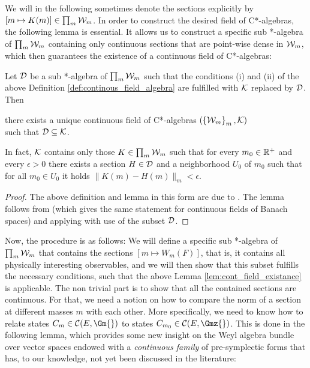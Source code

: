 We will in the following sometimes denote the sections explicitly by $[m \mapsto K(m)] \in \prod_{m} \mathcal{W}_m$.
In order to construct the desired field of C*-algebras, the following lemma is essential. It allows us to construct a specific sub *-algebra of $\prod_{m} \mathcal{W}_m$ containing only continuous sections that are point-wise dense in $\mathcal{W}_m$, which then guarantees the existence of a continuous field of C*-algebras:
\begin{lemma}\label{lem:cont_field_existance}
	Let $\mathcal{D}$ be a sub *-algebra of $\prod_m \mathcal{W}_m$ such that the conditions (i) and (ii) of the above Definition \ref{def:continous_field_algebra} are fulfilled with $\mathcal{K}$ replaced by $\mathcal{D}$. 
	Then 
	\begin{center}
there exists a unique continuous field of C*-algebras $(\left\{ \mathcal{W}_m \right\}_m , \mathcal{K})$\\ such that $\mathcal{D} \subseteq \mathcal{K}$. 
	\end{center}
	In fact, $\mathcal{K}$ contains only those $K \in \prod_m \mathcal{W}_m$ such that for every $m_0 \in \mathbb{R}^+$ and every $\epsilon > 0$ there exists a section $H \in \mathcal{D}$ and a neighborhood $U_0$ of $m_0$ such that for all $m_0 \in U_0$ it holds $\| K(m) - H(m)\|_m < \epsilon$.
\end{lemma}
\begin{proof}
	The above definition and lemma in this form are due to \cite[Chapter 2]{rieckers_honegger_deformation}. The lemma follows from \cite[Proposition 10.2.3]{dixmier} (which gives the same statement for continuous fields of Banach spaces) and applying \cite[Proposition 10.3.2]{dixmier} with use of the subset $\mathcal{D}$.
\end{proof}
Now, the procedure is as follows: We will define a specific sub *-algebra of $\prod_m \mathcal{W}_m$ that contains the sections $[m \mapsto W_m(F)]$, that is, it contains all physically interesting observables, and we will then show that this subset fulfills the necessary conditions, such that the above Lemma \ref{lem:cont_field_existance} is applicable. The non trivial part is to show that all the contained sections are continuous. For that, we need a notion on how to compare the norm of a section at different masses $m$ with each other. More specifically, we need to know how to relate states $C_m \in \mathcal{C}(E, \Gm{} )$ to states $C_{m_0} \in \mathcal{C} (E, \Gmz{})$. This is done in the following lemma, which provides some new insight on the Weyl algebra bundle over vector spaces endowed with a \emph{continuous family} of pre-symplectic forms that has, to our knowledge, not yet been discussed in the literature:
